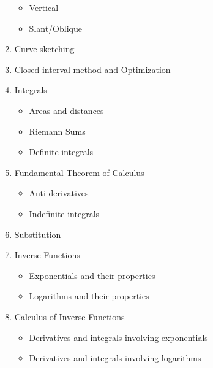 \documentclass[12pt]{amsart}
\begin{document}
\begin{multicols}{2}
\begin{enumerate}[1.]
\begin{itemize}
  \item
    Vertical
  \item
    Slant/Oblique
  \end{itemize}
\item
  Curve sketching
\item
  Closed interval method and Optimization
\item
  Integrals
  \begin{itemize}
  \item
    Areas and distances
  \item
    Riemann Sums
  \item
    Definite integrals
  \end{itemize}
\item
  Fundamental Theorem of Calculus
  \begin{itemize}
  \item
    Anti-derivatives
  \item
    Indefinite integrals
  \end{itemize}
\item
  Substitution
\item
  Inverse Functions
  \begin{itemize}
  \item
    Exponentials and their properties
  \item
    Logarithms and their properties
  \end{itemize}
\item
  Calculus of Inverse Functions
  \begin{itemize}
  \item
    Derivatives and integrals involving exponentials
  \item
    Derivatives and integrals involving logarithms
  \end{itemize}
  \end{enumerate}
\end{multicols}
\end{document}
